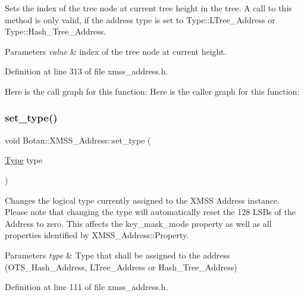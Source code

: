 Sets the index of the tree node at current tree height in the tree. A call to this method is only valid, if the address type is set to Type\+::\+L\+Tree\+\_\+\+Address or Type\+::\+Hash\+\_\+\+Tree\+\_\+\+Address.


\begin{DoxyParams}{Parameters}
{\em value} & index of the tree node at current height. \\
\hline
\end{DoxyParams}


Definition at line 313 of file xmss\+\_\+address.\+h.

Here is the call graph for this function\+:
Here is the caller graph for this function\+:
\mbox{\label{class_botan_1_1_x_m_s_s___address_a57148e8e415efce53531406607526236}} 
\subsubsection{\texorpdfstring{set\+\_\+type()}{set\_type()}}
{\footnotesize\ttfamily void Botan\+::\+X\+M\+S\+S\+\_\+\+Address\+::set\+\_\+type (\begin{DoxyParamCaption}\item[{\mbox{\hyperlink{class_botan_1_1_x_m_s_s___address_a0101e45c5608cf312b497bf6d855000e}{Type}}}]{type }\end{DoxyParamCaption})\hspace{0.3cm}{\ttfamily [inline]}}

Changes the logical type currently assigned to the X\+M\+SS Address instance. Please note that changing the type will automatically reset the 128 L\+S\+Bs of the Address to zero. This affects the key\+\_\+mask\+\_\+mode property as well as all properties identified by X\+M\+S\+S\+\_\+\+Address\+::\+Property.


\begin{DoxyParams}{Parameters}
{\em type} & Type that shall be assigned to the address (O\+T\+S\+\_\+\+Hash\+\_\+\+Address, L\+Tree\+\_\+\+Address or Hash\+\_\+\+Tree\+\_\+\+Address) \\
\hline
\end{DoxyParams}


Definition at line 111 of file xmss\+\_\+address.\+h.

